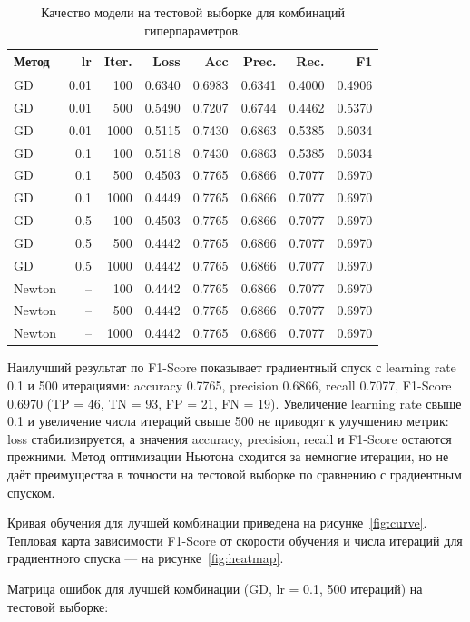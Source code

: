 \documentclass[12pt,a4paper]{article}
\begin{document}
\begin{table}[H]
\centering
\caption{Качество модели на тестовой выборке для комбинаций гиперпараметров.}
\label{tab:hp}
\begin{tabular}{lrrrrrrr}
\toprule
Метод & lr & Iter. & Loss & Acc & Prec. & Rec. & F1 \\
\midrule
GD & 0.01 & 100 & 0.6340 & 0.6983 & 0.6341 & 0.4000 & 0.4906 \\
GD & 0.01 & 500 & 0.5490 & 0.7207 & 0.6744 & 0.4462 & 0.5370 \\
GD & 0.01 & 1000 & 0.5115 & 0.7430 & 0.6863 & 0.5385 & 0.6034 \\
GD & 0.1 & 100 & 0.5118 & 0.7430 & 0.6863 & 0.5385 & 0.6034 \\
GD & 0.1 & 500 & 0.4503 & 0.7765 & 0.6866 & 0.7077 & 0.6970 \\
GD & 0.1 & 1000 & 0.4449 & 0.7765 & 0.6866 & 0.7077 & 0.6970 \\
GD & 0.5 & 100 & 0.4503 & 0.7765 & 0.6866 & 0.7077 & 0.6970 \\
GD & 0.5 & 500 & 0.4442 & 0.7765 & 0.6866 & 0.7077 & 0.6970 \\
GD & 0.5 & 1000 & 0.4442 & 0.7765 & 0.6866 & 0.7077 & 0.6970 \\
Newton & -- & 100 & 0.4442 & 0.7765 & 0.6866 & 0.7077 & 0.6970 \\
Newton & -- & 500 & 0.4442 & 0.7765 & 0.6866 & 0.7077 & 0.6970 \\
Newton & -- & 1000 & 0.4442 & 0.7765 & 0.6866 & 0.7077 & 0.6970 \\
\bottomrule
\end{tabular}
\end{table}

Наилучший результат по F1-Score показывает градиентный спуск с learning rate 0.1 и 500 итерациями: accuracy 0.7765, precision 0.6866, recall 0.7077, F1-Score 0.6970 (TP = 46, TN = 93, FP = 21, FN = 19). Увеличение learning rate свыше 0.1 и увеличение числа итераций свыше 500 не приводят к улучшению метрик: loss стабилизируется, а значения accuracy, precision, recall и F1-Score остаются прежними. Метод оптимизации Ньютона сходится за немногие итерации, но не даёт преимущества в точности на тестовой выборке по сравнению с градиентным спуском.

Кривая обучения для лучшей комбинации приведена на рисунке~\ref{fig:curve}. Тепловая карта зависимости F1-Score от скорости обучения и числа итераций для градиентного спуска --- на рисунке~\ref{fig:heatmap}.

Матрица ошибок для лучшей комбинации (GD, lr = 0.1, 500 итераций) на тестовой выборке:
\end{document}
